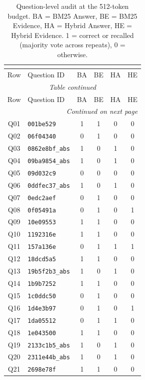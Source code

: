 \begin{longtable}{@{}clcccc@{}}
\caption{Question-level audit at the 512-token budget. BA = BM25 Answer, BE = BM25 Evidence, HA = Hybrid Answer, HE = Hybrid Evidence. 1 = correct or recalled (majority vote across repeats), 0 = otherwise.}\\
\label{tab:audit_512}\\
\toprule
Row & Question ID & BA & BE & HA & HE \\
\midrule
\endfirsthead
\multicolumn{6}{c}{{\itshape Table \thetable{} continued}} \\[2pt]
\toprule Row & Question ID & BA & BE & HA & HE \\ \midrule
\endhead
\midrule \multicolumn{6}{r}{{\itshape Continued on next page}} \\
\endfoot
\bottomrule
\endlastfoot
Q01 & \texttt{001be529} & 1 & 1 & 0 & 0 \\
Q02 & \texttt{06f04340} & 0 & 1 & 0 & 0 \\
Q03 & \texttt{0862e8bf\_abs} & 1 & 0 & 1 & 0 \\
Q04 & \texttt{09ba9854\_abs} & 1 & 0 & 1 & 0 \\
Q05 & \texttt{09d032c9} & 0 & 0 & 0 & 0 \\
Q06 & \texttt{0ddfec37\_abs} & 1 & 0 & 1 & 0 \\
Q07 & \texttt{0edc2aef} & 0 & 1 & 0 & 0 \\
Q08 & \texttt{0f05491a} & 0 & 1 & 0 & 1 \\
Q09 & \texttt{10e09553} & 1 & 1 & 0 & 0 \\
Q10 & \texttt{1192316e} & 1 & 1 & 0 & 0 \\
Q11 & \texttt{157a136e} & 0 & 1 & 1 & 1 \\
Q12 & \texttt{18dcd5a5} & 1 & 1 & 0 & 0 \\
Q13 & \texttt{19b5f2b3\_abs} & 1 & 0 & 1 & 0 \\
Q14 & \texttt{1b9b7252} & 1 & 1 & 0 & 0 \\
Q15 & \texttt{1c0ddc50} & 0 & 1 & 0 & 0 \\
Q16 & \texttt{1d4e3b97} & 0 & 1 & 0 & 1 \\
Q17 & \texttt{1da05512} & 0 & 1 & 1 & 0 \\
Q18 & \texttt{1e043500} & 1 & 1 & 0 & 0 \\
Q19 & \texttt{2133c1b5\_abs} & 1 & 0 & 1 & 0 \\
Q20 & \texttt{2311e44b\_abs} & 1 & 0 & 1 & 0 \\
Q21 & \texttt{2698e78f} & 1 & 1 & 0 & 0 \\

\end{longtable}
